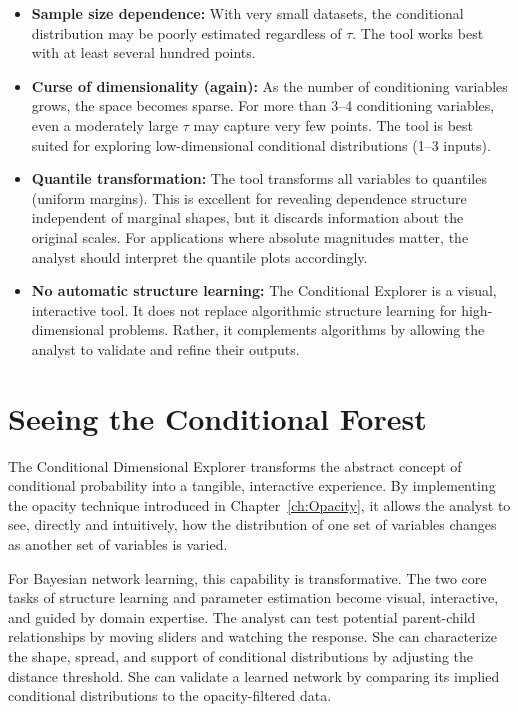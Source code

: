 \begin{itemize}
    \item \textbf{Sample size dependence:} With very small datasets, the conditional distribution may be poorly estimated regardless of \(\tau\). The tool works best with at least several hundred points.
    \item \textbf{Curse of dimensionality (again):} As the number of conditioning variables grows, the space becomes sparse. For more than 3–4 conditioning variables, even a moderately large \(\tau\) may capture very few points. The tool is best suited for exploring low-dimensional conditional distributions (1–3 inputs).
    \item \textbf{Quantile transformation:} The tool transforms all variables to quantiles (uniform margins). This is excellent for revealing dependence structure independent of marginal shapes, but it discards information about the original scales. For applications where absolute magnitudes matter, the analyst should interpret the quantile plots accordingly.
    \item \textbf{No automatic structure learning:} The Conditional Explorer is a visual, interactive tool. It does not replace algorithmic structure learning for high-dimensional problems. Rather, it complements algorithms by allowing the analyst to validate and refine their outputs.
\end{itemize}

\section{Seeing the Conditional Forest}

The Conditional Dimensional Explorer transforms the abstract concept of conditional probability into a tangible, interactive experience. By implementing the opacity technique introduced in Chapter~\ref{ch:Opacity}, it allows the analyst to see, directly and intuitively, how the distribution of one set of variables changes as another set of variables is varied.

For Bayesian network learning, this capability is transformative. The two core tasks of structure learning and parameter estimation become visual, interactive, and guided by domain expertise. The analyst can test potential parent-child relationships by moving sliders and watching the response. She can characterize the shape, spread, and support of conditional distributions by adjusting the distance threshold. She can validate a learned network by comparing its implied conditional distributions to the opacity-filtered data.

